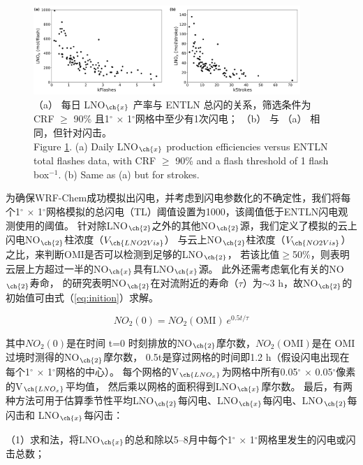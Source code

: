 \begin{figure}[H]
\centering
\includegraphics[width=0.9\textwidth]{./figures/us_flash_threshold.png}
\caption{
（a） 每日 LNO$_{\ch{x}}$ 产率与 ENTLN 总闪的关系，筛选条件为CRF $\geq$ 90\% 且1$^{\circ}$ $\times$ 1$^{\circ}$网格中至少有1次闪电；
 （b） 与 （a） 相同，但针对闪击。\\
Figure \ref{fig:us_flash_threshold}. (a) Daily LNO$_{\ch{x}}$ production efficiencies versus ENTLN total flashes data, with CRF $\geq$ 90\% and a flash threshold of 1 flash box$^{-1}$.
(b) Same as (a) but for strokes.}
\label{fig:us_flash_threshold}
\end{figure}


为确保WRF-Chem成功模拟出闪电，并考虑到闪电参数化的不确定性，我们将每个1$^{\circ}$ $\times$ 1$^{\circ}$网格模拟的总闪电（TL）阈值设置为1000，该阈值低于ENTLN闪电观测使用的阈值。
针对除LNO$_{\ch{2}}$之外的其他NO$_{\ch{2}}$源，我们定义了模拟的云上闪电NO$_{\ch{2}}$柱浓度（$V_{\ch{LNO2Vis}}$）
与云上NO$_{\ch{2}}$柱浓度（$V_{\ch{NO2Vis}}$）之比，来判断OMI是否可以检测到足够的LNO$_{\ch{2}}$，
若该比值$\geq$50\%，则表明云层上方超过一半的NO$_{\ch{x}}$具有LNO$_{\ch{x}}$源。
此外还需考虑氧化有关的NO$_{\ch{2}}$寿命，
\citet{Nault.2017}的研究表明NO$_{\ch{2}}$在对流附近的寿命（$\tau$）为$\sim$3 h，故NO$_{\ch{2}}$的初始值可由式（\ref{eq:inition}）求解。

\begin{equation} \label{eq:inition}
NO_2(0) = NO_2(\mathrm{OMI})\ e^{0.5t/\tau}
\end{equation}

其中$NO_2(0)$是在时间 t=0 时刻排放的NO$_{\ch{2}}$摩尔数，$NO_2(\mathrm{OMI})$是在 OMI 过境时测得的NO$_{\ch{2}}$摩尔数，
0.5t是穿过网格的时间即1.2 h（假设闪电出现在每个1$^{\circ}$ $\times$ 1$^{\circ}$网格的中心）。
每个网格的V$_{\ch{LNO_x}}$为网格中所有0.05$^{\circ}$ $\times$ 0.05$^{\circ}$像素的V$_{\ch{LNO_x}}$平均值，
然后乘以网格的面积得到LNO$_{\ch{x}}$摩尔数。
最后，有两种方法可用于估算季节性平均LNO$_{\ch{2}}$每闪电、LNO$_{\ch{x}}$每闪电、LNO$_{\ch{2}}$每闪击和 LNO$_{\ch{x}}$每闪击：

（1）求和法，将LNO$_{\ch{x}}$的总和除以5--8月中每个1$^{\circ}$ $\times$ 1$^{\circ}$网格里发生的闪电或闪击总数；


